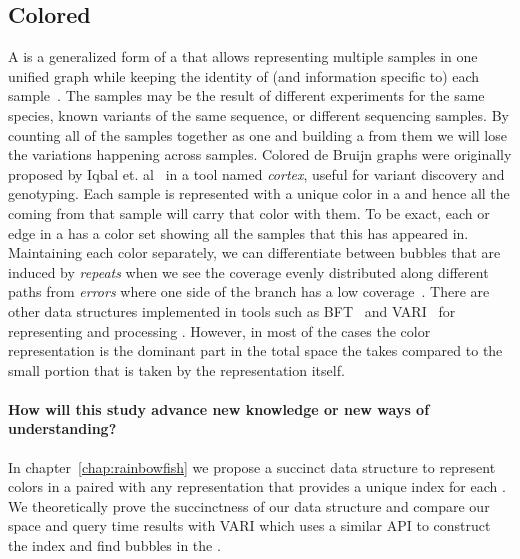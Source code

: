\subsection{Colored \dbg}
A \cdbg is a generalized form of a \dbg that allows representing multiple samples
in one unified graph while keeping the identity of (and information specific to) each sample~\cite{Iqbal2012Novo}.
The samples may be the result of different experiments for the same species, known variants of the same sequence,
or different sequencing samples. By counting all of the samples together as one
and building a \dbg from them we will lose the variations happening across samples.
Colored de Bruijn graphs were originally proposed by Iqbal et. al~\cite{Iqbal2012Novo}
in a tool named \emph{cortex}, useful for variant discovery and genotyping.
Each sample is represented with a unique color in a \cdbg and
hence all the \kmers coming from that sample will carry that color with them.
To be exact, each \kmer or edge in a \cdbg has a color set showing all the samples
that this \kmer has appeared in.
Maintaining each color separately, we can differentiate between bubbles that are induced by \emph{repeats}
when we see the coverage evenly distributed along different paths from \emph{errors}
where one side of the branch has a low coverage~\cite{Iqbal2012Novo}.
There are other data structures implemented in tools such as BFT~\cite{holley2016bloom}
and VARI~\cite{MuggliBoNo17} for representing and processing \cdbgs.
However, in most of the cases the color representation is the dominant part in the total space
the \cdbg takes compared to the small portion that is taken by the \dbg representation itself.

\paragraph*{How will this study advance new knowledge or new ways of understanding?}
In chapter~\ref{chap:rainbowfish} we propose a succinct data structure to represent colors in a \cdbg
paired with any \dbg representation that provides a unique index for each \kmer.
We theoretically prove the succinctness of our data structure and compare our space and query time results
with VARI which uses a similar API to construct the index and find bubbles in the \cdbg.

